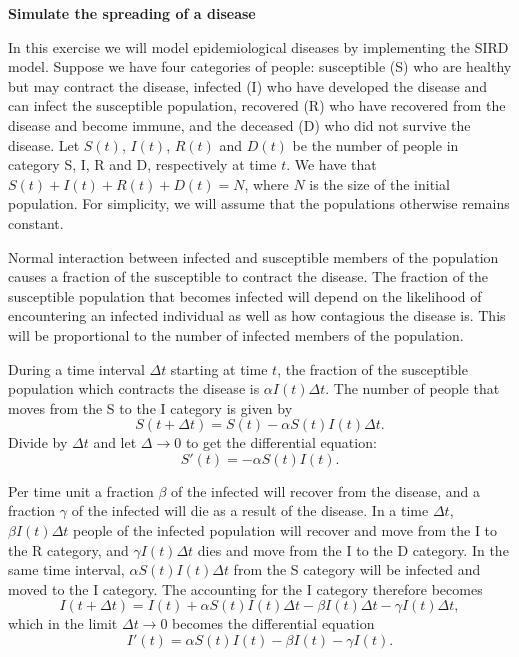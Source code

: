 \begin{Problem}{\textbf{Simulate the spreading of a disease}}\label{bjorgvin}  

\noindent
In this exercise we will model epidemiological diseases by implementing the SIRD model. Suppose we have four categories of people: susceptible (S) who are healthy but may contract the disease, infected (I) who have developed the disease and can infect the susceptible population, recovered (R) who have recovered from the disease and become immune, and the deceased (D) who did not survive the disease. Let $S(t)$, $I(t)$, $R(t)$ and $D(t)$ be the number of people in category S, I, R and D, respectively at time $t$. We have that $S(t) + I(t) + R(t) + D(t) = N$, where $N$ is the size of the initial population. For simplicity, we will assume that the populations otherwise remains constant.

Normal interaction between infected and susceptible members of the population causes a fraction of the susceptible to contract the disease. The fraction of the susceptible population that becomes infected will depend on the likelihood of encountering an infected individual as well as how contagious the disease is. This will be proportional to the number of infected members of the population.

During a time interval $\Delta t$ starting at time $t$, the fraction of the susceptible population which contracts the disease is $\alpha I (t) \Delta t$. The number of people that moves from the S to the I category is given by
\begin{equation*}
    S(t+\Delta t) = S(t) - \alpha S(t)I(t)\Delta t.
\end{equation*}
Divide by $\Delta t$ and let $\Delta \rightarrow 0$ to get the differential equation:
\begin{equation} \label{eq:1}
S'(t)=-\alpha S(t) I(t). 
\end{equation}

Per time unit a fraction $\beta$ of the infected will recover from the disease, and  a fraction $\gamma$ of the infected will die as a result of the disease. In a time $\Delta t$, $\beta I(t) \Delta t$ people of the infected population will recover and move from the I to the R category, and $\gamma I(t) \Delta t$ dies and move from the I to the D category. In the same time interval, $\alpha S(t)I(t)\Delta t$ from the S category will be infected and moved to the I category. The accounting for the I category therefore becomes
\begin{equation*}
I(t+\Delta t) = I(t) + \alpha S (t) I(t) \Delta t - \beta I(t)\Delta t - \gamma I(t) \Delta t,   
\end{equation*}
which in the limit $\Delta t \rightarrow 0$ becomes the differential equation
\begin{equation} \label{eq:2}
I'(t) = \alpha S(t) I(t) - \beta I(t) - \gamma I(t) . 
\end{equation}


\end{Problem}
